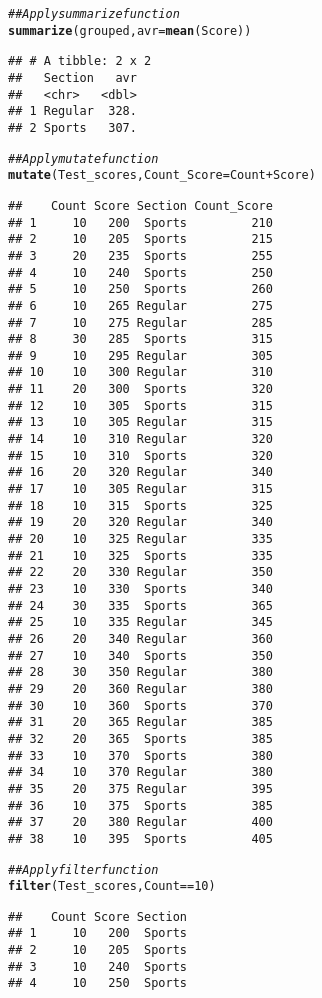 \documentclass{article}\usepackage[]{graphicx}\usepackage[]{xcolor}
\makeatletter
\newcommand{\hlnum}[1]{\textcolor[rgb]{0.686,0.059,0.569}{#1}}%
\newcommand{\hlcom}[1]{\textcolor[rgb]{0.678,0.584,0.686}{\textit{#1}}}%
\newcommand{\hlopt}[1]{\textcolor[rgb]{0,0,0}{#1}}%
\newcommand{\hlstd}[1]{\textcolor[rgb]{0.345,0.345,0.345}{#1}}%
\newcommand{\hlkwc}[1]{\textcolor[rgb]{0.333,0.667,0.333}{#1}}%
\newcommand{\hlkwd}[1]{\textcolor[rgb]{0.737,0.353,0.396}{\textbf{#1}}}%
\newenvironment{kframe}{%
 \def\at@end@of@kframe{}%
 \ifinner\ifhmode%
  \def\at@end@of@kframe{\end{minipage}}%
  \begin{minipage}{\columnwidth}%
 \fi\fi%
 \def\FrameCommand##1{\hskip\@totalleftmargin \hskip-\fboxsep
 \colorbox{shadecolor}{##1}\hskip-\fboxsep
     \hskip-\linewidth \hskip-\@totalleftmargin \hskip\columnwidth}%
 \MakeFramed {\advance\hsize-\width
   \@totalleftmargin\z@ \linewidth\hsize
   \@setminipage}}%
 {\par\unskip\endMakeFramed%
 \at@end@of@kframe}
\newenvironment{knitrout}{}{} %
\makeatother
\begin{document}
\begin{knitrout}
\begin{kframe}
\begin{alltt}
\hlcom{## Apply summarize function}
\hlkwd{summarize}\hlstd{(grouped,} \hlkwc{avr} \hlstd{=} \hlkwd{mean}\hlstd{(Score))}
\end{alltt}
\begin{verbatim}
## # A tibble: 2 x 2
##   Section   avr
##   <chr>   <dbl>
## 1 Regular  328.
## 2 Sports   307.
\end{verbatim}
\begin{alltt}
\hlcom{## Apply mutate function}
\hlkwd{mutate}\hlstd{(Test_scores,} \hlkwc{Count_Score} \hlstd{= Count} \hlopt{+} \hlstd{Score)}
\end{alltt}
\begin{verbatim}
##    Count Score Section Count_Score
## 1     10   200  Sports         210
## 2     10   205  Sports         215
## 3     20   235  Sports         255
## 4     10   240  Sports         250
## 5     10   250  Sports         260
## 6     10   265 Regular         275
## 7     10   275 Regular         285
## 8     30   285  Sports         315
## 9     10   295 Regular         305
## 10    10   300 Regular         310
## 11    20   300  Sports         320
## 12    10   305  Sports         315
## 13    10   305 Regular         315
## 14    10   310 Regular         320
## 15    10   310  Sports         320
## 16    20   320 Regular         340
## 17    10   305 Regular         315
## 18    10   315  Sports         325
## 19    20   320 Regular         340
## 20    10   325 Regular         335
## 21    10   325  Sports         335
## 22    20   330 Regular         350
## 23    10   330  Sports         340
## 24    30   335  Sports         365
## 25    10   335 Regular         345
## 26    20   340 Regular         360
## 27    10   340  Sports         350
## 28    30   350 Regular         380
## 29    20   360 Regular         380
## 30    10   360  Sports         370
## 31    20   365 Regular         385
## 32    20   365  Sports         385
## 33    10   370  Sports         380
## 34    10   370 Regular         380
## 35    20   375 Regular         395
## 36    10   375  Sports         385
## 37    20   380 Regular         400
## 38    10   395  Sports         405
\end{verbatim}
\begin{alltt}
\hlcom{## Apply filter function}
\hlkwd{filter}\hlstd{(Test_scores, Count} \hlopt{==} \hlnum{10}\hlstd{)}
\end{alltt}
\begin{verbatim}
##    Count Score Section
## 1     10   200  Sports
## 2     10   205  Sports
## 3     10   240  Sports
## 4     10   250  Sports

\end{verbatim}
\end{kframe}
\end{knitrout}
\end{document}

